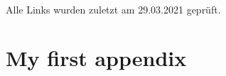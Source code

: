\documentclass[
  numbers=autoendperiod,
  ngerman,  %
  a4paper,  %
  twoside,  %
  bibliography=totoc,
  headsepline,
  cleardoublepage=empty,
  parskip=half,
  draft=false
]{scrbook}
\theoremstyle{break}
\begin{document}
\ \\
%
\noindent
Alle Links wurden zuletzt am 29.03.2021 geprüft.



\clearpage
\appendix

\chapter{My first appendix}\label{sec:appendix1}

\lipsum[1]

\pagestyle{empty}
\renewcommand*{\chapterpagestyle}{empty}
\Versicherung
\end{document}
